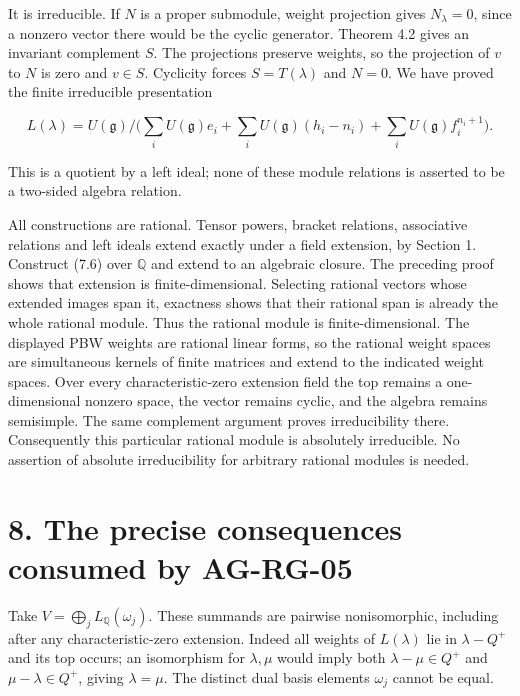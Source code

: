 \documentclass[11pt,a4paper,openany]{report}
\newcounter{none}
\begin{document}
It is irreducible. If \(N\) is a proper submodule, weight projection gives \(N_\lambda=0\), since a nonzero vector there would be the cyclic generator. Theorem 4.2 gives an invariant complement \(S\). The projections preserve weights, so the projection of \(v\) to \(N\) is zero and \(v\in S\). Cyclicity forces \(S=T(\lambda)\) and \(N=0\). We have proved the finite irreducible presentation

\[
L(\lambda)=U(\mathfrak g)\Big/
\Big(\sum_iU(\mathfrak g)e_i
+\sum_iU(\mathfrak g)(h_i-n_i)
+\sum_iU(\mathfrak g)f_i^{n_i+1}\Big).
\tag{7.6}
\]

This is a quotient by a left ideal; none of these module relations is asserted to be a two-sided algebra relation.

All constructions are rational. Tensor powers, bracket relations, associative relations and left ideals extend exactly under a field extension, by Section 1. Construct (7.6) over \(\mathbb Q\) and extend to an algebraic closure. The preceding proof shows that extension is finite-dimensional. Selecting rational vectors whose extended images span it, exactness shows that their rational span is already the whole rational module. Thus the rational module is finite-dimensional. The displayed PBW weights are rational linear forms, so the rational weight spaces are simultaneous kernels of finite matrices and extend to the indicated weight spaces. Over every characteristic-zero extension field the top remains a one-dimensional nonzero space, the vector remains cyclic, and the algebra remains semisimple. The same complement argument proves irreducibility there. Consequently this particular rational module is absolutely irreducible. No assertion of absolute irreducibility for arbitrary rational modules is needed.

\section{8. The precise consequences consumed by AG-RG-05}\label{AG-RG-S06-the-precise-consequences-consumed-by-ag-rg-05}

Take \(V=\bigoplus_j L_{\mathbb Q}(\omega_j)\). These summands are pairwise nonisomorphic, including after any characteristic-zero extension. Indeed all weights of \(L(\lambda)\) lie in \(\lambda-Q^+\) and its top occurs; an isomorphism for \(\lambda,\mu\) would imply both \(\lambda-\mu\in Q^+\) and \(\mu-\lambda\in Q^+\), giving \(\lambda=\mu\). The distinct dual basis elements \(\omega_j\) cannot be equal.
\end{document}
